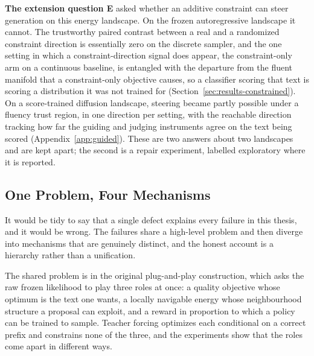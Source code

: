 \textbf{The extension question E} asked whether an additive constraint can steer generation on this energy landscape. On the frozen autoregressive landscape it cannot. The trustworthy paired contrast between a real and a randomized constraint direction is essentially zero on the discrete sampler, and the one setting in which a constraint-direction signal does appear, the constraint-only arm on a continuous baseline, is entangled with the departure from the fluent manifold that a constraint-only objective causes, so a classifier scoring that text is scoring a distribution it was not trained for (Section~\ref{sec:results-constrained}). On a score-trained diffusion landscape, steering became partly possible under a fluency trust region, in one direction per setting, with the reachable direction tracking how far the guiding and judging instruments agree on the text being scored (Appendix~\ref{app:guided}). These are two answers about two landscapes and are kept apart; the second is a repair experiment, labelled exploratory where it is reported.

\subsection{One Problem, Four Mechanisms}
\label{sec:disc-unified}

It would be tidy to say that a single defect explains every failure in this thesis, and it would be wrong. The failures share a high-level problem and then diverge into mechanisms that are genuinely distinct, and the honest account is a hierarchy rather than a unification.

The shared problem is in the original plug-and-play construction, which asks the raw frozen likelihood to play three roles at once: a quality objective whose optimum is the text one wants, a locally navigable energy whose neighbourhood structure a proposal can exploit, and a reward in proportion to which a policy can be trained to sample. Teacher forcing optimizes each conditional on a correct prefix and constrains none of the three, and the experiments show that the roles come apart in different ways.

